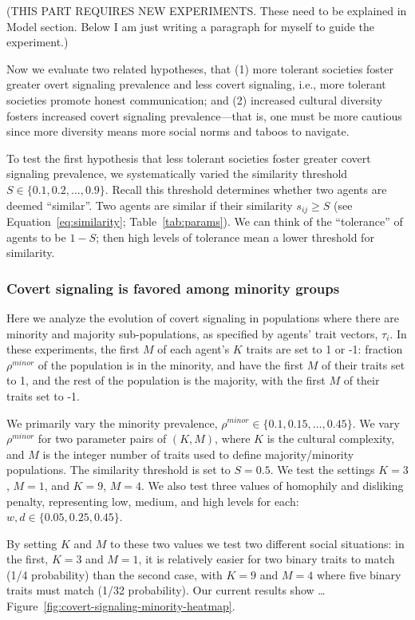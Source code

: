 \documentclass[11pt,letterpaper]{article}
\begin{document}
(THIS PART REQUIRES NEW EXPERIMENTS. These need to be explained in Model 
  section. Below I am just writing a paragraph for myself to guide the 
experiment.)

Now we evaluate two related hypotheses, that (1) more tolerant societies
foster greater overt signaling prevalence and less covert signaling, i.e., more
tolerant societies promote honest communication; 
and (2) increased cultural diversity fosters increased 
covert signaling prevalence---that is, one must be more cautious since more
diversity means more social norms and taboos to navigate. 

To test the first hypothesis that less tolerant societies foster greater
covert signaling prevalence, we
systematically varied the similarity threshold $S \in \{0.1, 0.2, \ldots, 0.9\}$.
Recall this threshold determines whether
two agents are deemed ``similar''. Two agents are similar if their similarity
$s_{ij} \geq S$ (see Equation~\ref{eq:similarity}; Table~\ref{tab:params}). 
We can think of the ``tolerance'' of agents to be $1-S$; then
high levels of tolerance mean a lower threshold for similarity. 


\subsubsection{Covert signaling is favored among minority groups}

Here we analyze the evolution of covert signaling in populations where there
are minority and majority sub-populations, as specified by agents' trait
vectors, $\tau_i$. In these experiments, the first $M$ of each agent's $K$ traits
are set to 1 or -1: fraction $\rho^{minor}$ of the
population is in the minority, and have the first $M$ of their traits set to
1, and the rest of the population is the majority, with the first $M$ of their
traits set to -1. 

We primarily vary the minority prevalence, $\rho^{minor} \in \{0.1, 0.15, \ldots, 0.45\}$. 
We vary $\rho^{minor}$ for two parameter pairs of $(K, M)$, where $K$ is the cultural 
complexity, and $M$ is the integer number of traits used to define 
majority/minority populations. The similarity threshold is set to $S=0.5$. 
We test the settings $K=3$, $M=1$, and $K=9$, $M=4$. We also test three
values of homophily and disliking penalty, representing low, medium, and high
levels for each: $w,d \in \{0.05, 0.25, 0.45\}$.

By setting $K$ and $M$ to these two values we test two different social
situations: in the first, $K=3$ and $M=1$, it is relatively easier for two binary traits
to match (1/4 probability) than the second case, 
with $K=9$ and $M=4$ where five binary traits must match (1/32 probability).
Our current results show \dots
Figure~\ref{fig:covert-signaling-minority-heatmap}. 
\end{document}
